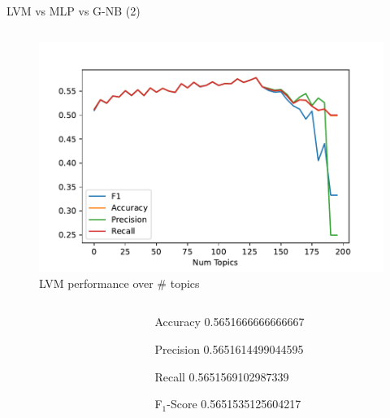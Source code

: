 \documentclass[aspectratio=169,xcolor=dvipsnames]{beamer}
\begin{document}
\begin{frame}{LVM vs MLP vs G-NB (2)}
    \vspace*{-10mm}
    \begin{columns}
        \hspace{-5mm}
        \begin{column}{.7\textwidth}
            \vspace*{-10mm}
            \begin{figure}
                \centering
                \includegraphics[width=.8\textwidth]{images/summary_l-svm.pdf}
                \vspace{-3mm}
                \caption{LVM performance over \# topics}
                \label{fig:lvm}
            \end{figure}
            \vspace{-7mm}
            
            \begin{columns}
                \begin{column}{.3\textwidth}
                     
                \end{column}
                \begin{column}{.7\textwidth}
                     {\footnotesize
                        \begin{itemize}
                            \item[Accuracy] 0.5651666666666667 
                            \item[Precision] 0.5651614499044595 
                            \item[Recall] 0.5651569102987339 
                            \item[F$_1$-Score] 0.5651535125604217 
                        \end{itemize}
                    }
                \end{column}
            \end{columns}
               

\end{column}
\end{columns}
\end{frame}
\end{document}
